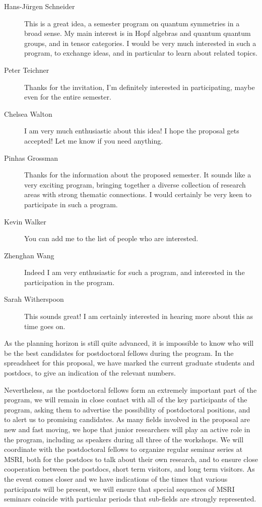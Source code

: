 \documentclass[12pt]{article}
\begin{document}
\begin{description}
\item[Hans-J\"urgen Schneider] This is a great idea, a semester program on quantum symmetries in a broad sense. My main interest is in Hopf algebras and quantum quantum groups, and in tensor categories. I would be very much interested in such a program, to exchange ideas, and in particular to learn about related topics.
\item[Peter Teichner] Thanks for the invitation, I'm definitely interested in participating, maybe even for the entire semester.
\item[Chelsea Walton] I am very much enthusiastic about this idea! I hope the proposal gets accepted! Let me know if you need anything.
\item[Pinhas Grossman] Thanks for the information about the proposed semester. It sounds like a very exciting program, bringing together a diverse collection of research areas with strong thematic connections. I would certainly be very keen to participate in such a program.
\item[Kevin Walker] You can add me to the list of people who are interested.
\item[Zhenghan Wang] Indeed I am very enthusiastic for such a program, and interested in the participation in the program.
\item[Sarah Witherspoon] This sounds great! I am certainly interested in hearing more about this as time goes on.
\end{description}

As the planning horizon is still quite advanced, it is impossible to know who will be the best candidates for postdoctoral fellows during the program. In the spreadsheet for this proposal, we have marked the current graduate students and postdocs, to give an indication of the relevant numbers.

Nevertheless, as the postdoctoral fellows form an extremely important part of the program, we will remain in close contact with all of the key participants of the program, asking them to advertise the possibility of postdoctoral positions, and to alert us to promising candidates. As many fields involved in the proposal are new and fast moving, we hope that junior researchers will play an active role in the program, including as speakers during all three of the workshops. We will coordinate with the postdoctoral fellows to organize regular seminar series at MSRI, both for the postdocs to talk about their own research, and to ensure close cooperation between the postdocs, short term visitors, and long term visitors. As the event comes closer and we have indications of the times that various participants will be present, we will ensure that special sequences of MSRI seminars coincide with particular periods that sub-fields are strongly represented.
\end{document}
